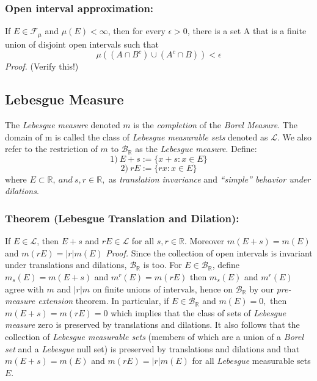 \documentclass{article}
\begin{document}
\subsubsection{Open interval approximation:}
If $E \in \mathcal{F}_\mu$ and $\mu(E)<\infty$, then for every $\epsilon>0$, there is a set A that is a finite union of disjoint open intervals such that
\[
\mu((A\cap B^c) \cup (A^c\cap B)) < \epsilon
\]
\textit{Proof.}\newline \newline 
(Verify this!)
\subsection{Lebesgue Measure}
The \emph{Lebesgue measure} denoted $m$ is the \emph{completion} of the \emph{Borel Measure}. The domain of m is called the class of \emph{Lebesgue measurable sets} denoted as $\mathcal{L}$. We also refer to the restriction of $m$ to $\mathcal{B}_{\mathbb{R}}$ as the \emph{Lebesgue measure}. Define:
\[
1) \ E+s:=\{x+s:x\in E\}
\]
\[
2) \ rE:=\{rx:x\in E\}
\]
where $E\subset \mathbb{R},\ and\ s,r\in\mathbb{R}, $ as \emph{translation invariance} and \emph{``simple'' behavior under dilations}.
\subsubsection{Theorem (Lebesgue Translation and Dilation):}
If $E\in \mathcal{L}$, then $E+s$ and $rE\in\mathcal{L}$ for all $s,r\in\mathbb{R}$. Moreover $m(E+s)=m(E)$ and $m(rE)=|r|m(E)$\newline \newline 
\textit{Proof.}\newline \newline 
Since the collection of open intervals is invariant under translations and dilations, $\mathcal{B}_{\mathbb{R}}$ is too. For $E\in\mathcal{B}_{\mathbb{R}}$, define $m_s(E)=m(E+s)$ and $m^r(E)=m(rE)$ then  $m_s(E)$ and $m^r(E)$ agree with $m$ and $|r|m$ on finite unions of intervals, hence on $\mathcal{B}_{\mathbb{R}}$ by our \emph{pre-measure extension} theorem. In particular, if $E\in\mathcal{B}_{\mathbb{R}}$ and $m(E)=0,$ then $m(E+s)=m(rE)=0$ which implies that the class of sets of \emph{Lebesgue measure} zero is preserved by translations and dilations. It also follows that the collection of \emph{Lebesgue measurable sets} (members of which are a union of a \emph{Borel set} and a \emph{Lebesgue} null set) is preserved by translations and dilations and that $m(E+s)=m(E)$ and $m(rE)=|r|m(E)$ for all \emph{Lebesgue} measurable sets $E$.
\end{document}
